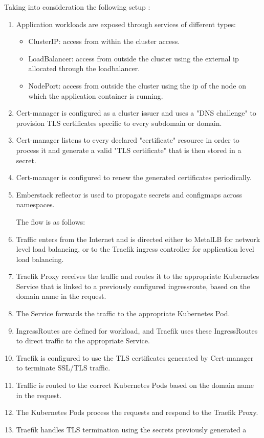 Taking into consideration the following setup :
\begin{enumerate}
\item Application workloads are exposed through services of different types:
    \begin{itemize}[label={--}]
        \item ClusterIP: access from within the cluster access.
        \item LoadBalancer: access from outside the cluster using the external ip allocated through the loadbalancer.
        \item NodePort: access from outside the cluster using the ip of the node on which the application container is running.
    \end{itemize}

\item Cert-manager is configured as a cluster issuer and uses a "DNS challenge" to provision TLS certificates specific to every subdomain or domain.

\item Cert-manager listens to every declared "certificate" resource in order to process it and generate a valid "TLS certificate" that is then stored in a secret.

\item Cert-manager is configured to renew the generated certificates periodically.

\item Emberstack reflector is used to propagate secrets and configmaps across namespaces.

The flow is as follows:

\item Traffic enters from the Internet and is directed either to MetalLB for network level load balancing, or to the Traefik ingress controller for application level load balancing.

\item Traefik Proxy receives the traffic and routes it to the appropriate Kubernetes Service that is linked to a previously configured ingressroute, based on the domain name in the request.

\item The Service forwards the traffic to the appropriate Kubernetes Pod.

\item IngressRoutes are defined for workload, and Traefik uses these IngressRoutes to direct traffic to the appropriate Service.

\item Traefik is configured to use the TLS certificates generated by Cert-manager to terminate SSL/TLS traffic.

\item Traffic is routed to the correct Kubernetes Pods based on the domain name in the request.

\item The Kubernetes Pods process the requests and respond to the Traefik Proxy.

\item Traefik handles TLS termination using the secrets previously generated a
\end{enumerate}

